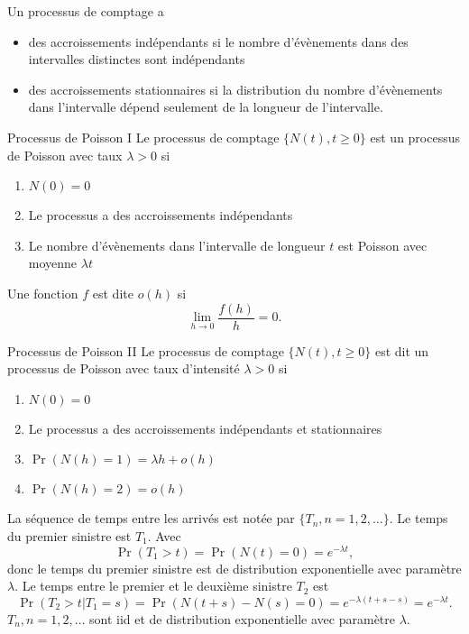 Un processus de comptage a
\begin{itemize}
	\item des accroissements indépendants si le nombre d'évènements dans des intervalles distinctes sont indépendants
	\item des accroissements stationnaires si la distribution du nombre d'évènements dans l'intervalle dépend seulement de la longueur de l'intervalle. 
\end{itemize}

\begin{definition}{Processus de Poisson I}{}
	Le processus de comptage $\{N(t), t \geq 0\}$ est un processus de Poisson avec taux $\lambda > 0$ si
	\begin{enumerate}
		\item $N(0) = 0$
		\item Le processus a des accroissements indépendants
		\item Le nombre d'évènements dans l'intervalle de longueur $t$ est Poisson avec moyenne $\lambda t$
	\end{enumerate}
\end{definition}

\begin{definition}{}{}
	Une fonction $f$ est dite $o(h)$ si 
	$$\lim\limits_{h\to 0} \frac{f(h)}{h} = 0.$$
\end{definition}

\begin{definition}{Processus de Poisson II}{}
	Le processus de comptage $\{N(t), t\geq 0\}$ est dit un processus de Poisson avec taux d'intensité $\lambda > 0$ si
	\begin{enumerate}
		\item $N(0) = 0$
		\item Le processus a des accroissements indépendants et stationnaires
		\item $\Pr(N(h) = 1) = \lambda h + o(h)$
		\item $\Pr(N(h) = 2) = o(h)$
	\end{enumerate}
\end{definition}

\begin{definition}{}{}
	La séquence de temps entre les arrivés est notée par $\{T_n, n = 1, 2, \dots\}$. Le temps du premier sinistre est $T_1$. Avec 
	$$\Pr(T_1 > t) = \Pr(N(t) = 0) = e^{-\lambda t},$$
	donc le temps du premier sinistre est de distribution exponentielle avec paramètre $\lambda$. Le temps entre le premier et le deuxième sinistre $T_2$ est 
	$$\Pr(T_2 > t \vert T_1 = s) = \Pr(N(t + s) - N(s) = 0) = e^{-\lambda (t + s - s)} = e^{-\lambda t}.$$
	\tcblower
	$T_n, n = 1, 2, \dots$ sont iid et de distribution exponentielle avec paramètre $\lambda$. 
\end{definition}

